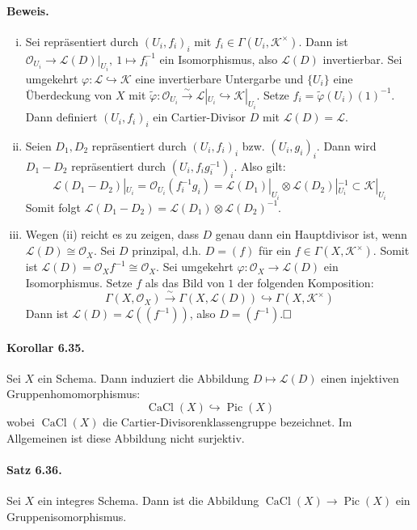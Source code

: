 \documentclass[11pt,b5paper,openany]{memoir}
\def \qed {$\hfill\square$}
\begin{document}
\paragraph{Beweis.} \begin{enumerate}[(i)]
\item Sei repräsentiert durch $(U_i,f_i)_i$ mit $f_i\in\Gamma(U_i,\mathcal{K}^\times)$. Dann ist $\mathcal{O}_{U_i}\to\mathcal{L}(D)|_{U_i},\ 1\mapsto f_i^{-1}$ ein Isomorphismus, also $\mathcal{L}(D)$ invertierbar. Sei umgekehrt $\varphi:\mathcal{L}\hookrightarrow\mathcal{K}$ eine invertierbare Untergarbe und $\{U_i\}$ eine Überdeckung von $X$ mit $\tilde{\varphi}:\mathcal{O}_{U_i}\stackrel{\sim}{\to}\mathcal{L}|_{U_i}\hookrightarrow\mathcal{K}|_{U_i}$. Setze $f_i=\tilde{\varphi}(U_i)(1)^{-1}$. Dann definiert $(U_i,f_i)_i$ ein Cartier-Divisor $D$ mit $\mathcal{L}(D)=\mathcal{L}$.
\item Seien $D_1, D_2$ repräsentiert durch $(U_i,f_i)_i$ bzw. $(U_i,g_i)_i$. Dann wird $D_1-D_2$ repräsentiert durch $(U_i,f_ig_i^{-1})_i$. Also gilt:
\[\mathcal{L}(D_1-D_2)|_{U_i}=\mathcal{O}_{U_i}(f_i^{-1}g_i)=\mathcal{L}(D_1)|_{U_i}\otimes \mathcal{L}(D_2)|_{U_i}^{-1}\subset\mathcal{K}|_{U_i} \]
Somit folgt $\mathcal{L}(D_1-D_2)=\mathcal{L}(D_1)\otimes\mathcal{L}(D_2)^{-1}$.
\item Wegen (ii) reicht es zu zeigen, dass $D$ genau dann ein Hauptdivisor ist, wenn $\mathcal{L}(D)\cong\mathcal{O}_X$. Sei $D$ prinzipal, d.h. $D=(f)$ für ein $f\in\Gamma(X,\mathcal{K}^\times)$. Somit ist $\mathcal{L}(D)=\mathcal{O}_Xf^{-1}\cong\mathcal{O}_X$. Sei umgekehrt $\varphi:\mathcal{O}_X\to\mathcal{L}(D)$ ein Isomorphismus. Setze $f$ als das Bild von $1$ der folgenden Komposition:
\[\Gamma(X,\mathcal{O}_X)\stackrel{\sim}{\to} \Gamma(X,\mathcal{L}(D))\hookrightarrow\Gamma(X,\mathcal{K}^\times) \]
Dann ist $\mathcal{L}(D)=\mathcal{L}((f^{-1}))$, also $D=(f^{-1})$.\qed
\end{enumerate}

\paragraph{Korollar 6.35.}\label{6.35} Sei $X$ ein Schema. Dann induziert die Abbildung $D\mapsto\mathcal{L}(D)$ einen injektiven Gruppenhomomorphismus:
\[\operatorname{CaCl}(X)\hookrightarrow\operatorname{Pic}(X)\]
wobei $\operatorname{CaCl}(X)$ die Cartier-Divisorenklassengruppe bezeichnet. Im Allgemeinen ist diese Abbildung nicht surjektiv.

\paragraph{Satz 6.36.}\label{6.36} Sei $X$ ein integres Schema. Dann ist die Abbildung $\operatorname{CaCl}(X)\to\operatorname{Pic}(X)$ ein Gruppenisomorphismus.
\end{document}
